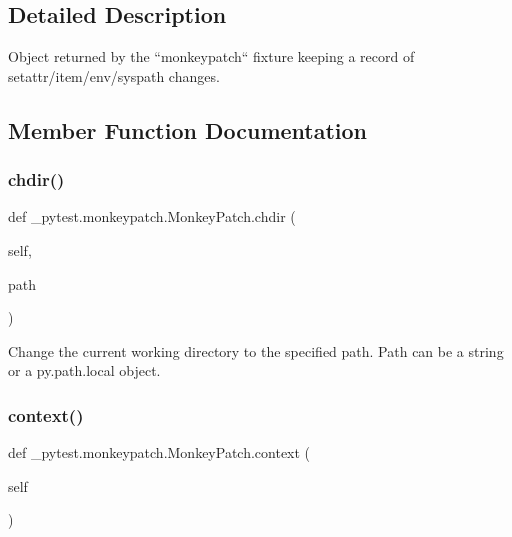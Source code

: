 \subsection{Detailed Description}
\begin{DoxyVerb}Object returned by the ``monkeypatch`` fixture keeping a record of setattr/item/env/syspath changes.
\end{DoxyVerb}
 

\subsection{Member Function Documentation}
\mbox{\label{class__pytest_1_1monkeypatch_1_1_monkey_patch_a0557e1c8f8d7e3738eed674f21c6addc}} 
\subsubsection{\texorpdfstring{chdir()}{chdir()}}
{\footnotesize\ttfamily def \+\_\+pytest.\+monkeypatch.\+Monkey\+Patch.\+chdir (\begin{DoxyParamCaption}\item[{}]{self,  }\item[{}]{path }\end{DoxyParamCaption})}

\begin{DoxyVerb}Change the current working directory to the specified path.
Path can be a string or a py.path.local object.
\end{DoxyVerb}
 \mbox{\label{class__pytest_1_1monkeypatch_1_1_monkey_patch_aa9f369b562c70493a77a04cb9831b73c}} 
\subsubsection{\texorpdfstring{context()}{context()}}
{\footnotesize\ttfamily def \+\_\+pytest.\+monkeypatch.\+Monkey\+Patch.\+context (\begin{DoxyParamCaption}\item[{}]{self }\end{DoxyParamCaption})}

